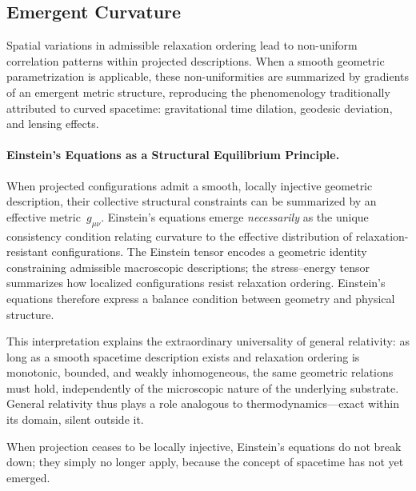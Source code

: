 \subsection{Emergent Curvature}
\label{subsec:emergent-curvature}

Spatial variations in admissible relaxation ordering lead to non-uniform
correlation patterns within projected descriptions.
When a smooth geometric parametrization is applicable, these
non-uniformities are summarized by gradients of an emergent metric
structure, reproducing the phenomenology traditionally attributed to
curved spacetime: gravitational time dilation, geodesic deviation, and
lensing effects.

\paragraph{Einstein's Equations as a Structural Equilibrium Principle.}
\label{subsec:einstein-equilibrium-principle}
When projected configurations admit a smooth, locally injective geometric
description, their collective structural constraints can be summarized by
an effective metric~$g_{\mu\nu}$.
Einstein's equations emerge \emph{necessarily} as the unique consistency
condition relating curvature to the effective distribution of
relaxation-resistant configurations.
The Einstein tensor encodes a geometric identity constraining admissible
macroscopic descriptions; the stress--energy tensor summarizes how
localized configurations resist relaxation ordering.
Einstein's equations therefore express a balance condition between
geometry and physical structure.

This interpretation explains the extraordinary universality of general
relativity: as long as a smooth spacetime description exists and
relaxation ordering is monotonic, bounded, and weakly inhomogeneous, the
same geometric relations must hold, independently of the microscopic
nature of the underlying substrate.
General relativity thus plays a role analogous to thermodynamics---exact
within its domain, silent outside it.

When projection ceases to be locally injective, Einstein's equations do
not break down; they simply no longer apply, because the concept of
spacetime has not yet emerged.
